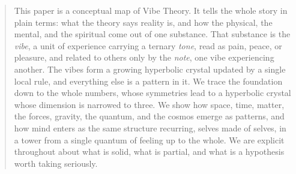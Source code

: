 \begin{abstract}
This paper is a conceptual map of Vibe Theory. It tells the whole story in plain terms: what the theory says reality
is, and how the physical, the mental, and the spiritual come out of one substance. That
substance is the \emph{vibe}, a unit of experience carrying a ternary \emph{tone}, read as pain,
peace, or pleasure, and related to others only by the \emph{note}, one vibe experiencing
another. The vibes form a growing hyperbolic crystal updated by a single local rule, and
everything else is a pattern in it. We trace the foundation down to the whole numbers, whose
symmetries lead to a hyperbolic crystal whose dimension is narrowed to three. We show how space,
time, matter, the forces, gravity, the quantum, and the cosmos emerge as patterns, and how mind
enters as the same structure recurring, selves made of selves, in a tower from a single quantum
of feeling up to the whole. We are explicit throughout about what is solid, what is partial, and
what is a hypothesis worth taking seriously.
\end{abstract}
